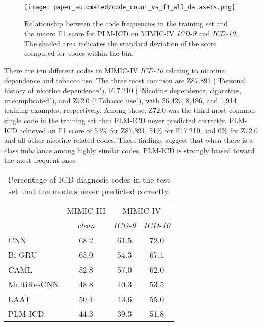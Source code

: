 {\begin{figure}[t]
    \centering
    \texttt{[image: paper\_automated/code\_count\_vs\_f1\_all\_datasets.png]}
    \caption[Relationship between the code frequencies in the training set and the macro F1 score for PLM-ICD on MIMIC-IV \textit{ICD-9} and \textit{ICD-10}]{Relationship between the code frequencies in the training set and the macro F1 score for PLM-ICD on MIMIC-IV \textit{ICD-9} and \textit{ICD-10}. The shaded area indicates the standard deviation of the score computed for codes within the bin.}
    \label{fig:icd9_vs_icd10}
\end{figure}

There are ten different codes in MIMIC-IV \textit{ICD-10} relating to nicotine dependence and tobacco use. The three most common are Z87.891 (``Personal history of nicotine dependence"), F17.210 (``Nicotine dependence, cigarettes, uncomplicated"), and Z72.0 (``Tobacco use"), with 26,427, 8,486, and 1,914 training examples, respectively. Among these, Z72.0 was the third most common single code in the training set that PLM-ICD never predicted correctly. PLM-ICD achieved an F1 score of 53\% for Z87.891, 51\% for F17.210, and 0\% for Z72.0 and all other nicotine-related codes. These findings suggest that when there is a class imbalance among highly similar codes, PLM-ICD is strongly biased toward the most frequent ones.

 \begin{table}[t]
    \centering
    \caption{Percentage of ICD diagnosis codes in the test set that the models never predicted correctly.}
    \label{tab:missed_classes}
    \begin{tabular}{lccc}
        \toprule
        & MIMIC-III & \multicolumn{2}{c}{MIMIC-IV}\\
        \cmidrule(lr){2-2}\cmidrule(lr){3-4}
        & \textit{clean} &  \textit{ICD-9} & \textit{ICD-10} \\
        \midrule
        CNN  & 68.2 & 61.5 & 72.0\\
        Bi-GRU  & 65.0 & 54.3 & 67.1\\
        CAML & 52.8 & 57.0 & 62.0  \\
        MultiResCNN  & 48.8 & 40.3 & 53.5 \\
        LAAT  & 50.4 & 43.6 & 55.0\\
        PLM-ICD   & 44.3 & 39.3 & 51.8\\
        \bottomrule
    \end{tabular}
\end{table}


}
